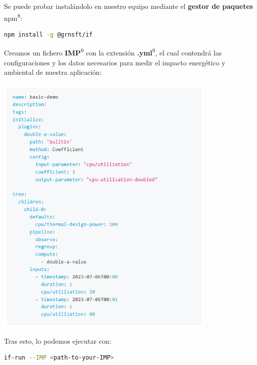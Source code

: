\documentclass[12pt,a4paper]{report}
\begin{document}
Se puede probar instalándolo en nuestro equipo mediante el \textbf{gestor de paquetes} npm\textsuperscript{8}:

\begin{tcolorbox}[colback=codebackground, colframe=codeborder, boxrule=0.8pt, arc=0mm, boxsep=5pt, left=5pt, right=5pt, top=5pt, bottom=5pt]
  \begin{lstlisting}[language=bash]
  npm install -g @grnsft/if
  \end{lstlisting}
\end{tcolorbox}

Creamos un fichero \textbf{IMP}\textsuperscript{9} con la extensión \textbf{.yml}\textsuperscript{9}, el cual contendrá las configuraciones y los datos necesarios para medir el impacto energético y ambiental de nuestra aplicación:

\begin{center}
  \includegraphics[width=0.8\textwidth]{imagenes/IF_1.png}
\end{center}

Tras esto, lo podemos ejecutar con:

\begin{tcolorbox}[colback=codebackground, colframe=codeborder, boxrule=0.8pt, arc=0mm, boxsep=5pt, left=5pt, right=5pt, top=5pt, bottom=5pt]
  \begin{lstlisting}[language=bash]
  if-run --IMP <path-to-your-IMP>
  \end{lstlisting}
\end{tcolorbox}
\end{document}
